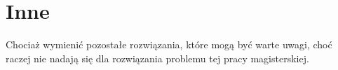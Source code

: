 \section{Inne}
Chociaż wymienić pozostałe rozwiązania, które mogą być warte uwagi, choć raczej nie nadają się dla rozwiązania problemu tej pracy magisterskiej.

%
%
%
%
%

